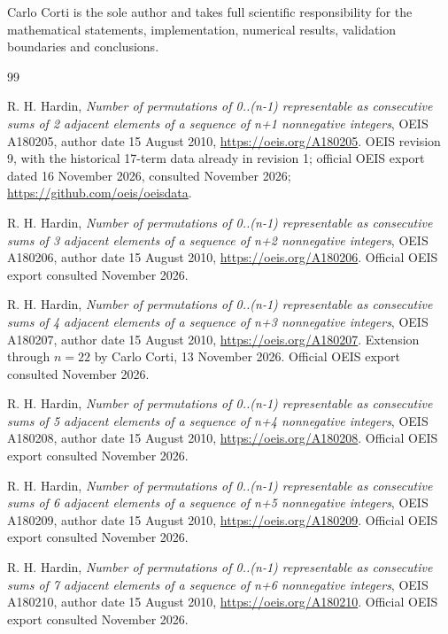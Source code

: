 \documentclass[11pt]{article}
\theoremstyle{definition}
\theoremstyle{remark}
\begin{document}
\smallskip
Carlo Corti is the sole author and takes full scientific responsibility for
the mathematical statements, implementation, numerical results, validation
boundaries and conclusions.\par
\endgroup

\clearpage
\begin{thebibliography}{99}

R. H. Hardin,
\emph{Number of permutations of 0..(n-1) representable as consecutive
sums of 2 adjacent elements of a sequence of n+1 nonnegative integers},
OEIS A180205, author date 15 August 2010,
\url{https://oeis.org/A180205}. OEIS revision 9, with the historical
17-term data already in revision 1; official OEIS export dated
16 November 2026, consulted November 2026;
\url{https://github.com/oeis/oeisdata}.

R. H. Hardin,
\emph{Number of permutations of 0..(n-1) representable as consecutive sums of 3 adjacent elements of a sequence of n+2 nonnegative integers},
OEIS A180206, author date 15 August 2010,
\url{https://oeis.org/A180206}.
Official OEIS export consulted November 2026.

R. H. Hardin,
\emph{Number of permutations of 0..(n-1) representable as consecutive sums of 4 adjacent elements of a sequence of n+3 nonnegative integers},
OEIS A180207, author date 15 August 2010,
\url{https://oeis.org/A180207}.
Extension through $n=22$ by Carlo Corti, 13 November 2026.
Official OEIS export consulted November 2026.

R. H. Hardin,
\emph{Number of permutations of 0..(n-1) representable as consecutive sums of 5 adjacent elements of a sequence of n+4 nonnegative integers},
OEIS A180208, author date 15 August 2010,
\url{https://oeis.org/A180208}.
Official OEIS export consulted November 2026.

R. H. Hardin,
\emph{Number of permutations of 0..(n-1) representable as consecutive sums of 6 adjacent elements of a sequence of n+5 nonnegative integers},
OEIS A180209, author date 15 August 2010,
\url{https://oeis.org/A180209}.
Official OEIS export consulted November 2026.

R. H. Hardin,
\emph{Number of permutations of 0..(n-1) representable as consecutive sums of 7 adjacent elements of a sequence of n+6 nonnegative integers},
OEIS A180210, author date 15 August 2010,
\url{https://oeis.org/A180210}.
Official OEIS export consulted November 2026.


\end{thebibliography}
\end{document}
